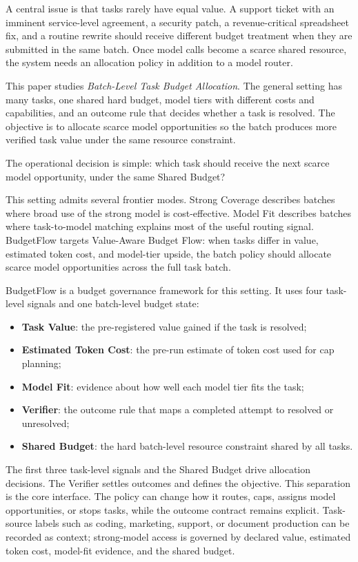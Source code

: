 \documentclass{article}
\newcommand{\method}{BudgetFlow\xspace}
\newcommand{\taskvalue}{Task Value\xspace}
\newcommand{\tokencost}{Estimated Token Cost\xspace}
\newcommand{\modelfit}{Model Fit\xspace}
\newcommand{\sharedbudget}{Shared Budget\xspace}
\newcommand{\verifier}{Verifier\xspace}
\begin{document}
A central issue is that tasks rarely have equal value. A support ticket with an imminent service-level agreement, a security patch, a revenue-critical spreadsheet fix, and a routine rewrite should receive different budget treatment when they are submitted in the same batch. Once model calls become a scarce shared resource, the system needs an allocation policy in addition to a model router.

This paper studies \emph{Batch-Level Task Budget Allocation}. The general setting has many tasks, one shared hard budget, model tiers with different costs and capabilities, and an outcome rule that decides whether a task is resolved. The objective is to allocate scarce model opportunities so the batch produces more verified task value under the same resource constraint.

The operational decision is simple: which task should receive the next scarce model opportunity, under the same \sharedbudget?

This setting admits several frontier modes. Strong Coverage describes batches where broad use of the strong model is cost-effective. Model Fit describes batches where task-to-model matching explains most of the useful routing signal. \method targets Value-Aware Budget Flow: when tasks differ in value, estimated token cost, and model-tier upside, the batch policy should allocate scarce model opportunities across the full task batch.

\method is a budget governance framework for this setting. It uses four task-level signals and one batch-level budget state:

\begin{itemize}
    \item \textbf{\taskvalue}: the pre-registered value gained if the task is resolved;
    \item \textbf{\tokencost}: the pre-run estimate of token cost used for cap planning;
    \item \textbf{\modelfit}: evidence about how well each model tier fits the task;
    \item \textbf{\verifier}: the outcome rule that maps a completed attempt to resolved or unresolved;
    \item \textbf{\sharedbudget}: the hard batch-level resource constraint shared by all tasks.
\end{itemize}

The first three task-level signals and the \sharedbudget drive allocation decisions. The \verifier settles outcomes and defines the objective. This separation is the core interface. The policy can change how it routes, caps, assigns model opportunities, or stops tasks, while the outcome contract remains explicit. Task-source labels such as coding, marketing, support, or document production can be recorded as context; strong-model access is governed by declared value, estimated token cost, model-fit evidence, and the shared budget.
\end{document}
